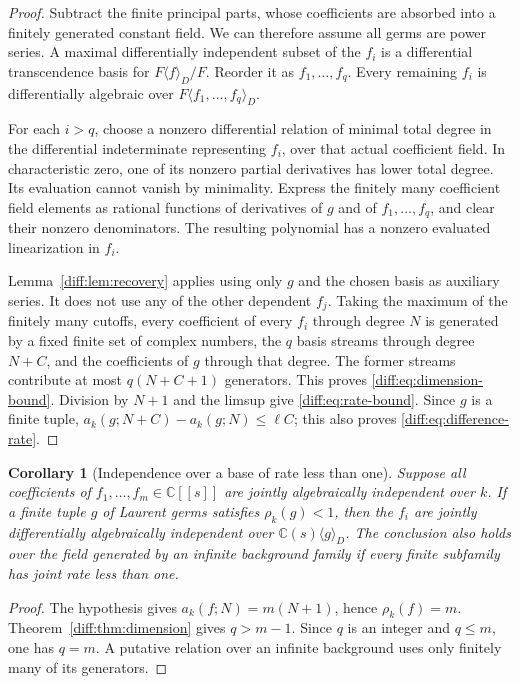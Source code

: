 \documentclass[11pt,a4paper]{article}
\newcommand{\C}{\mathbb C}
\newtheorem{corollary}[theorem]{Corollary}
\theoremstyle{definition}
\theoremstyle{remark}
\numberwithin{equation}{section}
\begin{document}
\begin{proof}
Subtract the finite principal parts, whose coefficients are absorbed
into a finitely generated constant field. We can therefore assume
all germs are power series. A maximal differentially independent
subset of the $f_i$ is a differential transcendence basis for
$F\langle f\rangle_D/F$. Reorder it as $f_1,\ldots,f_q$.
Every remaining $f_i$ is differentially algebraic over
$F\langle f_1,\ldots,f_q\rangle_D$.

For each $i>q$, choose a nonzero differential relation of minimal
total degree in the differential indeterminate representing $f_i$,
over that actual coefficient field. In characteristic zero, one of
its nonzero partial derivatives has lower total degree. Its evaluation
cannot vanish by minimality. Express the finitely many coefficient
field elements as rational functions of derivatives of $g$ and of
$f_1,\ldots,f_q$, and clear their nonzero denominators. The resulting
polynomial has a nonzero evaluated linearization in $f_i$.

Lemma~\ref{diff:lem:recovery} applies using only $g$ and the chosen
basis as auxiliary series. It does not use any of the other dependent
$f_j$. Taking the maximum of the finitely many cutoffs, every
coefficient of every $f_i$ through degree $N$ is generated by a
fixed finite set of complex numbers, the $q$ basis streams through
degree $N+C$, and the coefficients of $g$ through that degree.
The former streams contribute at most $q(N+C+1)$ generators.
This proves \eqref{diff:eq:dimension-bound}. Division by $N+1$ and the
limsup give \eqref{diff:eq:rate-bound}. Since $g$ is a finite tuple,
$a_k(g;N+C)-a_k(g;N)\le\ell C$; this also proves
\eqref{diff:eq:difference-rate}.
\end{proof}

\begin{corollary}[Independence over a base of rate less than one]
\label{diff:cor:gap}
Suppose all coefficients of $f_1,\ldots,f_m\in\C[[s]]$ are
jointly algebraically independent over $k$. If a finite tuple $g$
of Laurent germs satisfies $\rho_k(g)<1$, then the $f_i$ are
jointly differentially algebraically independent over
$\C(s)\langle g\rangle_D$.
The conclusion also holds over the field generated by an infinite
background family if every finite subfamily has joint rate less
than one.
\end{corollary}

\begin{proof}
The hypothesis gives $a_k(f;N)=m(N+1)$, hence $\rho_k(f)=m$.
Theorem~\ref{diff:thm:dimension} gives $q>m-1$. Since $q$ is an integer
and $q\le m$, one has $q=m$. A putative relation over an infinite
background uses only finitely many of its generators.
\end{proof}
\end{document}
